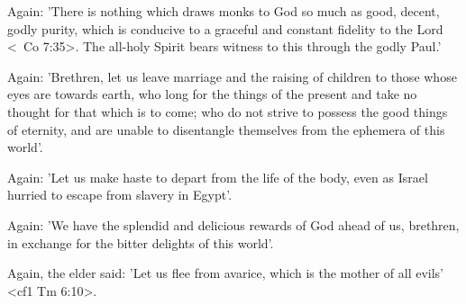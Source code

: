 Again: 'There is nothing which draws monks to God so much
as good, decent, godly purity, which is conducive to a graceful and
constant fidelity to the Lord <\ Co 7:35>.
The all-holy Spirit bears
witness to this through the godly Paul.'

Again: 'Brethren, let us leave marriage and the raising of
children to those whose eyes are towards earth, who long for the
things of the present and take no thought for that which is to come;
who do not strive to possess the good things of eternity, and are
unable to disentangle themselves from the ephemera of this world'.

Again: 'Let us make haste to depart from the life of the body,
even as Israel hurried to escape from slavery in Egypt'.

Again: 'We have the splendid and delicious rewards of God
ahead of us, brethren, in exchange for the bitter delights of this
world'.

Again, the elder said: 'Let us flee from avarice, which is the
mother of all evils' <cf1 Tm 6:10>.

